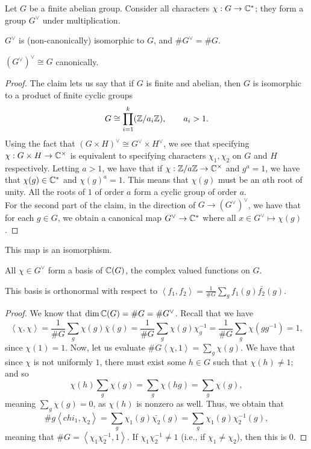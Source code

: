 \noindent Let $G$ be a finite abelian group. Consider all characters $\chi : G \to \mathbb C^\ast$; they form a group $G^\vee$ under multiplication.
\begin{claim}
    \begin{parlist}
        \item $G^\vee$ is (non-canonically) isomorphic to $G$, and $\# G^\vee = \# G$.
        \item $(G^\vee)^\vee \cong G$ canonically.
    \end{parlist}
\end{claim}
\begin{proof}
    The claim lets us say that if $G$ is finite and abelian, then $G$ is isomorphic to a product of finite cyclic groups
    \[ G \cong \prod_{i=1}^k (\mathbb Z / a_i \mathbb Z), \qquad a_i > 1. \]
    Using the fact that $(G \times H)^\vee \cong G^\vee \times H^\vee$, we see that specifying $\chi : G \times H \to \mathbb C^\times$ is equivalent to specifying characters $\chi_1, \chi_2$ on $G$ and $H$ respectively. Letting $a > 1$, we have that if $\chi : \mathbb Z / a \mathbb Z \to \mathbb C^\times$ and $g^a = 1$, we have that $\chi(g) \in \mathbb C^\ast$ and $\chi(g)^a = 1$. This means that $\chi(g)$ must be an $a$th root of unity. All the roots of $1$ of order $a$ form a cyclic group of order $a$.
    \\[8pt]
    For the second part of the claim, in the direction of $G \to (G^\vee)^\vee$, we have that for each $g \in G$, we obtain a canonical map $G^\vee \to \mathbb C^\ast$ where all $x \in G^\vee \mapsto \chi(g)$.
\end{proof}
\begin{lemma}
    This map is an isomorphism.
\end{lemma}
\begin{lemma}
    \begin{parlist}
        \item All $\chi \in G^\vee$ form a basis of $\mathbb C(G)$, the complex valued functions on $G$.
        \item This basis is orthonormal with respect to $\left<f_1, f_2\right> = \frac{1}{\# G} \sum_g f_1(g) \bar{f_2}(g)$.
    \end{parlist}
\end{lemma}
\begin{proof}
    We know that $\dim \mathbb C(G) = \# G = \# G^\vee$. Recall that we have
    \[ \left<\chi, \chi\right> = \frac{1}{\# G} \sum_g \chi(g) \bar{\chi}(g) = \frac{1}{\# G} \sum_g \chi(g) \chi_g^{-1} = \frac{1}{\# G} \sum_g \chi(gg^{-1}) = 1, \]
    since $\chi(1) = 1$. Now, let us evaluate $\# G \left<\chi, 1\right> = \sum_g \chi(g)$. We have that since $\chi$ is not uniformly $1$, there must exist some $h \in G$ such that $\chi(h) \neq 1$; and so
    \[ \chi(h) \sum_g \chi(g) = \sum_g \chi(hg) = \sum_g \chi(g), \]
    meaning $\sum_g \chi(g) = 0$, as $\chi(h)$ is nonzero as well. Thus, we obtain that
    \[ \# g \left<chi_1, \chi_2\right> = \sum_g \chi_1(g) \bar{\chi_2}(g) = \sum_g \chi_1(g) \chi_2^{-1}(g), \]
    meaning that $\# G = \left<\chi_1 \chi_2^{-1}, 1\right>$. If $\chi_1 \chi_2^{-1} \neq 1$ (i.e., if $\chi_1 \neq \chi_2$), then this is $0$.
\end{proof}
